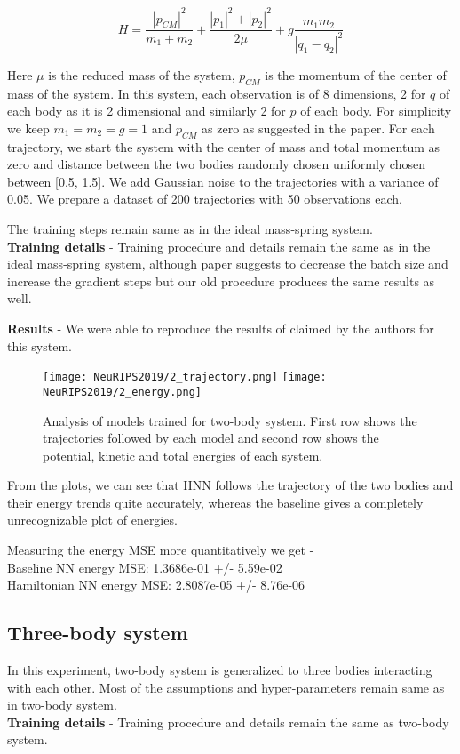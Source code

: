 \documentclass{article}
\begin{document}
\begin{equation}
H = \frac{|p_{CM}|^2}{m_1 + m_2} + \frac{|p_1|^2 + |p_2|^2}{2\mu} + g\frac{m_1m_2}{|q_1-q_2|^2}
\end{equation}

Here \(\mu\) is the reduced mass of the system, \(p_{CM}\) is the momentum of the center of mass of the system. In this system, each observation is of 8 dimensions, 2 for \(q\) of each body as it is 2 dimensional and similarly 2 for \(p\) of each body. For simplicity we keep \(m_1 = m_2 = g = 1\) and \(p_{CM}\) as zero as suggested in the paper.
For each trajectory, we start the system with the center of mass and total momentum as zero and distance between the two bodies randomly chosen uniformly chosen between [0.5, 1.5]. We add Gaussian noise to the trajectories with a variance of 0.05. We prepare a dataset of 200 trajectories with 50 observations each.

The training steps remain same as in the ideal mass-spring system.\\
\textbf{Training details} - Training procedure and details remain the same as in the ideal mass-spring system, although paper suggests to decrease the batch size and increase the gradient steps but our old procedure produces the same results as well.

\textbf{Results} - We were able to reproduce the results of claimed by the authors for this system.
\begin{figure}[htp]
    \centering
    \texttt{[image: NeuRIPS2019/2\_trajectory.png]}
    \texttt{[image: NeuRIPS2019/2\_energy.png]}
    \caption{Analysis of models trained for two-body system. First row shows the trajectories followed by each model and second row shows the potential, kinetic and total energies of each system.}
    \label{fig:galaxy}
\end{figure}

From the plots, we can see that HNN follows the trajectory of the two bodies and their energy trends quite accurately, whereas the baseline gives a completely unrecognizable plot of energies.

Measuring the energy MSE more quantitatively we get -\\
Baseline NN energy MSE: 1.3686e-01 +/- 5.59e-02\\
Hamiltonian NN energy MSE: 2.8087e-05 +/- 8.76e-06

\subsection{Three-body system}
In this experiment, two-body system is generalized to three bodies interacting with each other.
Most of the assumptions and hyper-parameters remain same as in two-body system.\\
\textbf{Training details} - Training procedure and details remain the same as two-body system.
\end{document}
